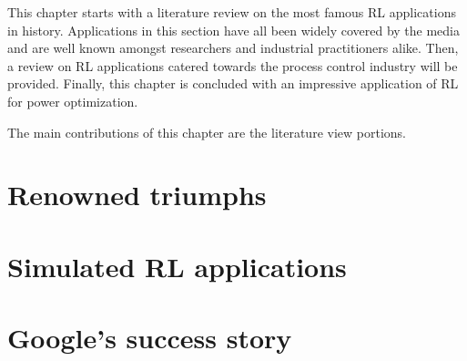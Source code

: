 %
%
% 

This chapter starts with a literature review on the most famous RL applications in history.  Applications in this section have all been widely covered by the media and are well known amongst researchers and industrial practitioners alike.  Then, a review on RL applications catered towards the process control industry will be provided. Finally, this chapter is concluded with an impressive application of RL for power optimization.

The main contributions of this chapter are the literature view portions.

\section{Renowned triumphs}

\section{Simulated RL applications}

\section{Google's success story}
